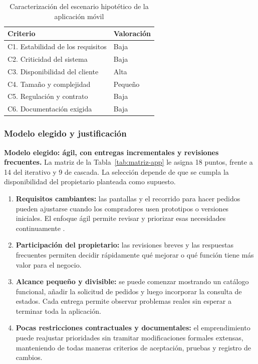 \begin{table}[H]
\centering\footnotesize
\caption{Caracterización del escenario hipotético de la aplicación móvil}
\label{tab:caracterizacion-app}
\begin{tabularx}{\textwidth}{@{}Yp{0.20\textwidth}@{}}
\toprule
\textbf{Criterio} & \textbf{Valoración}\\
\midrule
C1. Estabilidad de los requisitos & Baja\\
C2. Criticidad del sistema & Baja\\
C3. Disponibilidad del cliente & Alta\\
C4. Tamaño y complejidad & Pequeño\\
C5. Regulación y contrato & Baja\\
C6. Documentación exigida & Baja\\
\bottomrule
\end{tabularx}
\end{table}

\subsubsection{Modelo elegido y justificación}

\textbf{Modelo elegido: ágil, con entregas incrementales y revisiones
frecuentes.} La matriz de la Tabla~\ref{tab:matriz-app} le asigna 18 puntos,
frente a 14 del iterativo y 9 de cascada. La selección depende de que se
cumpla la disponibilidad del propietario planteada como supuesto.

\begin{enumerate}
  \item \textbf{Requisitos cambiantes:} las pantallas y el recorrido para
  hacer pedidos pueden ajustarse cuando los compradores usen prototipos o
  versiones iniciales. El enfoque ágil permite revisar y priorizar esas
  necesidades continuamente \cite{schon2017}.

  \item \textbf{Participación del propietario:} las revisiones breves y las
  respuestas frecuentes permiten decidir rápidamente qué mejorar o qué
  función tiene más valor para el negocio.

  \item \textbf{Alcance pequeño y divisible:} se puede comenzar mostrando
  un catálogo funcional, añadir la solicitud de pedidos y luego incorporar
  la consulta de estados. Cada entrega permite observar problemas reales
  sin esperar a terminar toda la aplicación.

  \item \textbf{Pocas restricciones contractuales y documentales:} el
  emprendimiento puede reajustar prioridades sin tramitar modificaciones
  formales extensas, manteniendo de todas maneras criterios de aceptación,
  pruebas y registro de cambios.
\end{enumerate}

